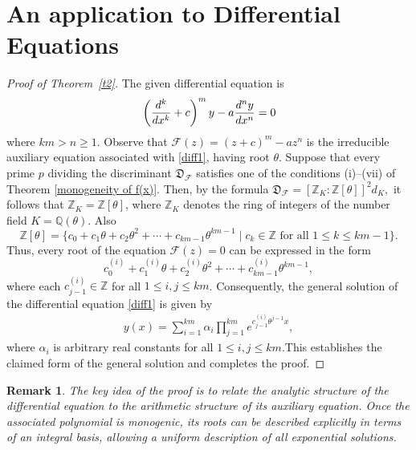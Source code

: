 \documentclass[table]{amsart}
\newtheorem{remark}[theorem]{Remark}
\newcommand{\Z}{\mathbb{Z}}
\newcommand{\D}{\mathfrak{D}}
\numberwithin{equation}{section}
\begin{document}
\section{An application to Differential Equations}
\begin{proof}[Proof of Theorem~\ref{t2}]
The given differential equation is \begin{align}{\label{diff1}}
    \left(\frac{d^k }{dx^k}+c\right)^my-a\frac{d^ny }{dx^n}=0 
    \end{align}
    where $km>n\geq 1$.  Observe that $\mathcal{F}(z) = (z+c)^m-az^n$ is the irreducible auxiliary equation associated with \eqref{diff1}, having root $\theta$. Suppose that every prime $p$ dividing the discriminant $\D_{\mathcal{F}}$ satisfies one of the conditions (i)–(vii) of Theorem \ref{monogeneity of f(x)}. Then, by the formula $
\D_{\mathcal{F}} = [\Z_K : \mathbb{Z}[\theta]]^2 d_K,
$ it follows that $\Z_K = \mathbb{Z}[\theta]$, where $\Z_K$ denotes the ring of integers of the number field $K = \mathbb{Q}(\theta)$. Also
 $$
 \mathbb{Z}[\theta] = \{c_0 + c_1\theta + c_2 \theta^2 +\cdots + c_{km-1}\theta^{km-1} \;|\; c_k \in \mathbb{Z} \text{ for all } 1\leq k\leq km-1     \}.
 $$
Thus, every root of the equation $\mathcal{F}(z) = 0$ can be expressed in the form
$$
c_0^{(i)} + c_1^{(i)}\theta + c_2^{(i)}\theta^2 + \cdots + c_{km-1}^{(i)}\theta^{km-1},
$$
where each $c_{j-1}^{(i)} \in \mathbb{Z}$ for all $1 \leq i,j \leq km$. Consequently, the general solution of the differential equation \eqref{diff1} is given by
\begin{align*}
    y(x) = \sum_{i=1}^{km} \alpha_i\prod_{j=1}^{km}e^{c_{j-1}^{(i)} \theta^{j-1}x},
\end{align*}
where  $\alpha_i$ is arbitrary real constants for all $1\leq i,j \leq km$.This establishes the claimed form of the general solution and completes the proof.
\end{proof}
\begin{remark}
 The key idea of the proof is to relate the analytic structure of the differential equation to the arithmetic structure of its auxiliary equation. Once the associated polynomial is monogenic, its roots can be described
explicitly in terms of an integral basis, allowing a uniform description of all exponential solutions.
\end{remark}
\end{document}
